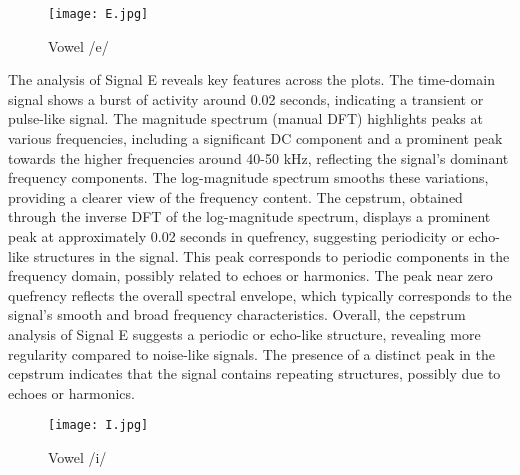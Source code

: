 \documentclass[a4paper,12pt]{article}
\begin{document}
   \begin{figure}[H]
    \centering
    \texttt{[image: E.jpg]}
    \caption{Vowel /e/}
    \label{fig:E}
\end{figure}


The analysis of Signal E reveals key features across the plots. The time-domain signal shows a burst of activity around 0.02 seconds, indicating a transient or pulse-like signal. The magnitude spectrum (manual DFT) highlights peaks at various frequencies, including a significant DC component and a prominent peak towards the higher frequencies around 40-50 kHz, reflecting the signal’s dominant frequency components. The log-magnitude spectrum smooths these variations, providing a clearer view of the frequency content. The cepstrum, obtained through the inverse DFT of the log-magnitude spectrum, displays a prominent peak at approximately 0.02 seconds in quefrency, suggesting periodicity or echo-like structures in the signal. This peak corresponds to periodic components in the frequency domain, possibly related to echoes or harmonics. The peak near zero quefrency reflects the overall spectral envelope, which typically corresponds to the signal’s smooth and broad frequency characteristics. Overall, the cepstrum analysis of Signal E suggests a periodic or echo-like structure, revealing more regularity compared to noise-like signals. The presence of a distinct peak in the cepstrum indicates that the signal contains repeating structures, possibly due to echoes or harmonics.

\begin{figure}[H]
    \centering
    \texttt{[image: I.jpg]}
    \caption{Vowel /i/}
    \label{fig:I}
\end{figure}
\end{document}

